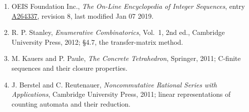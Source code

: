 \documentclass[11pt]{article}
\theoremstyle{definition}
\begin{document}
\begin{enumerate}

\item OEIS Foundation Inc., \emph{The On-Line Encyclopedia of Integer Sequences}, entry \href{https://oeis.org/A264337}{A264337}, revision 8, last modified Jan 07 2019.

\item R. P. Stanley, \emph{Enumerative Combinatorics}, Vol.~1, 2nd ed., Cambridge University Press, 2012; \S4.7, the transfer-matrix method.

\item M. Kauers and P. Paule, \emph{The Concrete Tetrahedron}, Springer, 2011; C-finite sequences and their closure properties.

\item J. Berstel and C. Reutenauer, \emph{Noncommutative Rational Series with Applications}, Cambridge University Press, 2011; linear representations of counting automata and their reduction.

\end{enumerate}
\end{document}
